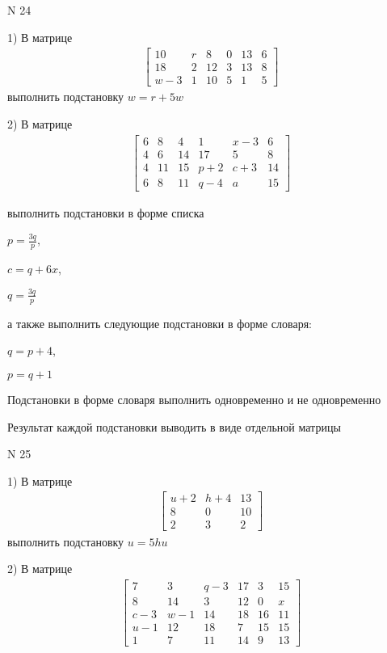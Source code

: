 \documentclass[11pt]{report}
\begin{document}
\newpage
N 24


    1) В матрице
\begin{align*}
\left[\begin{matrix}10 & r & 8 & 0 & 13 & 6\\18 & 2 & 12 & 3 & 13 & 8\\w - 3 & 1 & 10 & 5 & 1 & 5\end{matrix}\right]
\end{align*}
выполнить подстановку $w=r + 5 w$


    2) В матрице
\begin{align*}
\left[\begin{matrix}6 & 8 & 4 & 1 & x - 3 & 6\\4 & 6 & 14 & 17 & 5 & 8\\4 & 11 & 15 & p + 2 & c + 3 & 14\\6 & 8 & 11 & q - 4 & a & 15\end{matrix}\right]
\end{align*}

выполнить подстановки в форме списка

$p=\frac{3 q}{p}$,

$c=q + 6 x$,

$q=\frac{3 q}{p}$

а также выполнить следующие подстановки в форме словаря:

$q=p + 4$,

$p=q + 1$


    Подстановки в форме словаря выполнить одновременно и не одновременно


    Результат каждой подстановки выводить в виде отдельной матрицы

\newpage
N 25


    1) В матрице
\begin{align*}
\left[\begin{matrix}u + 2 & h + 4 & 13\\8 & 0 & 10\\2 & 3 & 2\end{matrix}\right]
\end{align*}
выполнить подстановку $u=5 h u$


    2) В матрице
\begin{align*}
\left[\begin{matrix}7 & 3 & q - 3 & 17 & 3 & 15\\8 & 14 & 3 & 12 & 0 & x\\c - 3 & w - 1 & 14 & 18 & 16 & 11\\u - 1 & 12 & 18 & 7 & 15 & 15\\1 & 7 & 11 & 14 & 9 & 13\end{matrix}\right]
\end{align*}
\end{document}
